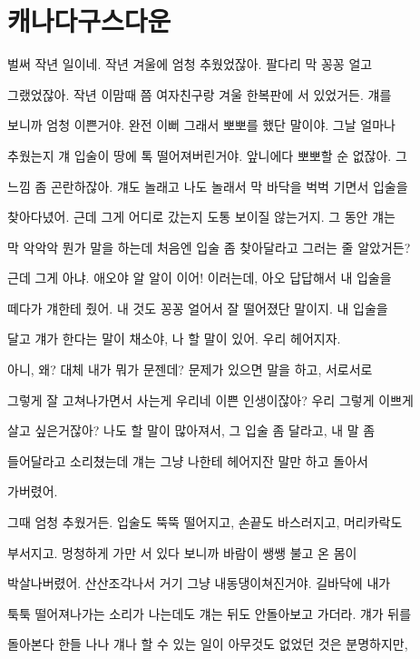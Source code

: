 \hypertarget{uxce90uxb098uxb2e4uxad6cuxc2a4uxb2e4uxc6b4}{%

\section{캐나다구스다운}\label{uxce90uxb098uxb2e4uxad6cuxc2a4uxb2e4uxc6b4}}



벌써 작년 일이네. 작년 겨울에 엄청 추웠었잖아. 팔다리 막 꽁꽁 얼고

그랬었잖아. 작년 이맘때 쯤 여자친구랑 겨울 한복판에 서 있었거든. 걔를

보니까 엄청 이쁜거야. 완전 이뻐 그래서 뽀뽀를 했단 말이야. 그날 얼마나

추웠는지 걔 입술이 땅에 톡 떨어져버린거야. 앞니에다 뽀뽀할 순 없잖아. 그

느낌 좀 곤란하잖아. 걔도 놀래고 나도 놀래서 막 바닥을 벅벅 기면서 입술을

찾아다녔어. 근데 그게 어디로 갔는지 도통 보이질 않는거지. 그 동안 걔는

막 악악악 뭔가 말을 하는데 처음엔 입술 좀 찾아달라고 그러는 줄 알았거든?

근데 그게 아냐. 애오야 알 알이 이어! 이러는데, 아오 답답해서 내 입술을

떼다가 걔한테 줬어. 내 것도 꽁꽁 얼어서 잘 떨어졌단 말이지. 내 입술을

달고 걔가 한다는 말이 채소야, 나 할 말이 있어. 우리 헤어지자.



아니, 왜? 대체 내가 뭐가 문젠데? 문제가 있으면 말을 하고, 서로서로

그렇게 잘 고쳐나가면서 사는게 우리네 이쁜 인생이잖아? 우리 그렇게 이쁘게

살고 싶은거잖아? 나도 할 말이 많아져서, 그 입술 좀 달라고, 내 말 좀

들어달라고 소리쳤는데 걔는 그냥 나한테 헤어지잔 말만 하고 돌아서

가버렸어.



그때 엄청 추웠거든. 입술도 뚝뚝 떨어지고, 손끝도 바스러지고, 머리카락도

부서지고. 멍청하게 가만 서 있다 보니까 바람이 쌩쌩 불고 온 몸이

박살나버렸어. 산산조각나서 거기 그냥 내동댕이쳐진거야. 길바닥에 내가

툭툭 떨어져나가는 소리가 나는데도 걔는 뒤도 안돌아보고 가더라. 걔가 뒤를

돌아본다 한들 나나 걔나 할 수 있는 일이 아무것도 없었던 것은 분명하지만,

